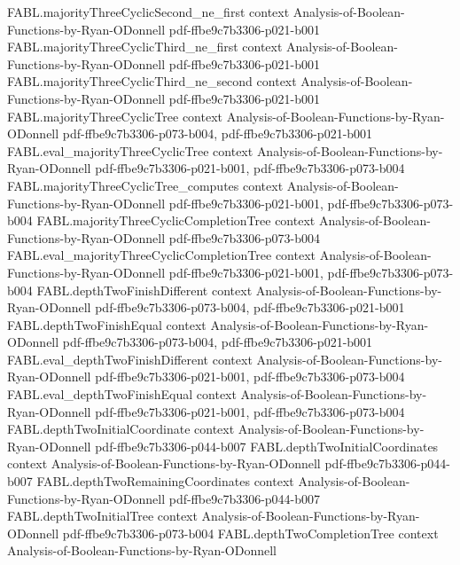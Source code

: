 \begin{theorem}
\proofstep
  {FABL.majorityThreeCyclicSecond_ne_first}
  {context}
  {Analysis-of-Boolean-Functions-by-Ryan-ODonnell}
  {pdf-ffbe9c7b3306-p021-b001}
\proofstep
  {FABL.majorityThreeCyclicThird_ne_first}
  {context}
  {Analysis-of-Boolean-Functions-by-Ryan-ODonnell}
  {pdf-ffbe9c7b3306-p021-b001}
\proofstep
  {FABL.majorityThreeCyclicThird_ne_second}
  {context}
  {Analysis-of-Boolean-Functions-by-Ryan-ODonnell}
  {pdf-ffbe9c7b3306-p021-b001}
\proofstep
  {FABL.majorityThreeCyclicTree}
  {context}
  {Analysis-of-Boolean-Functions-by-Ryan-ODonnell}
  {pdf-ffbe9c7b3306-p073-b004,
    pdf-ffbe9c7b3306-p021-b001}
\proofstep
  {FABL.eval_majorityThreeCyclicTree}
  {context}
  {Analysis-of-Boolean-Functions-by-Ryan-ODonnell}
  {pdf-ffbe9c7b3306-p021-b001,
    pdf-ffbe9c7b3306-p073-b004}
\proofstep
  {FABL.majorityThreeCyclicTree_computes}
  {context}
  {Analysis-of-Boolean-Functions-by-Ryan-ODonnell}
  {pdf-ffbe9c7b3306-p021-b001,
    pdf-ffbe9c7b3306-p073-b004}
\proofstep
  {FABL.majorityThreeCyclicCompletionTree}
  {context}
  {Analysis-of-Boolean-Functions-by-Ryan-ODonnell}
  {pdf-ffbe9c7b3306-p073-b004}
\proofstep
  {FABL.eval_majorityThreeCyclicCompletionTree}
  {context}
  {Analysis-of-Boolean-Functions-by-Ryan-ODonnell}
  {pdf-ffbe9c7b3306-p021-b001,
    pdf-ffbe9c7b3306-p073-b004}
\proofstep
  {FABL.depthTwoFinishDifferent}
  {context}
  {Analysis-of-Boolean-Functions-by-Ryan-ODonnell}
  {pdf-ffbe9c7b3306-p073-b004,
    pdf-ffbe9c7b3306-p021-b001}
\proofstep
  {FABL.depthTwoFinishEqual}
  {context}
  {Analysis-of-Boolean-Functions-by-Ryan-ODonnell}
  {pdf-ffbe9c7b3306-p073-b004,
    pdf-ffbe9c7b3306-p021-b001}
\proofstep
  {FABL.eval_depthTwoFinishDifferent}
  {context}
  {Analysis-of-Boolean-Functions-by-Ryan-ODonnell}
  {pdf-ffbe9c7b3306-p021-b001,
    pdf-ffbe9c7b3306-p073-b004}
\proofstep
  {FABL.eval_depthTwoFinishEqual}
  {context}
  {Analysis-of-Boolean-Functions-by-Ryan-ODonnell}
  {pdf-ffbe9c7b3306-p021-b001,
    pdf-ffbe9c7b3306-p073-b004}
\proofstep
  {FABL.depthTwoInitialCoordinate}
  {context}
  {Analysis-of-Boolean-Functions-by-Ryan-ODonnell}
  {pdf-ffbe9c7b3306-p044-b007}
\proofstep
  {FABL.depthTwoInitialCoordinates}
  {context}
  {Analysis-of-Boolean-Functions-by-Ryan-ODonnell}
  {pdf-ffbe9c7b3306-p044-b007}
\proofstep
  {FABL.depthTwoRemainingCoordinates}
  {context}
  {Analysis-of-Boolean-Functions-by-Ryan-ODonnell}
  {pdf-ffbe9c7b3306-p044-b007}
\proofstep
  {FABL.depthTwoInitialTree}
  {context}
  {Analysis-of-Boolean-Functions-by-Ryan-ODonnell}
  {pdf-ffbe9c7b3306-p073-b004}
\proofstep
  {FABL.depthTwoCompletionTree}
  {context}
  {Analysis-of-Boolean-Functions-by-Ryan-ODonnell}

\end{theorem}
